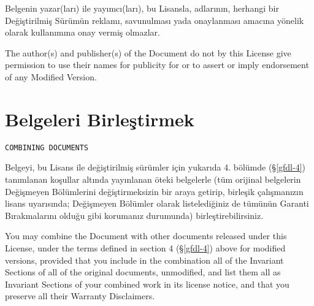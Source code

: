 \begin{multicols}{2}
Belgenin yazar(ları) ile yayımcı(ları), bu Lisansla, adlarının, herhangi bir Değiştirilmiş Sürümün reklamı, savunulması yada onaylanması amacına yönelik olarak kullanımına onay vermiş olmazlar.
\begin{ingliz}The author(s) and publisher(s) of the Document do not by
this License give permission to use their names for publicity
for or to assert or imply endorsement of any Modified Version.\end{ingliz}

\section{Belgeleri Birleştirmek}\hfill\begin{verbatim}COMBINING DOCUMENTS\end{verbatim}\label{gfdl-5}
Belgeyi, bu Lisans ile değiştirilmiş sürümler için yukarıda 4. bölümde (\S\thinspace\ref{gfdl-4}) tanımlanan koşullar altında yayınlanan öteki belgelerle (tüm orijinal belgelerin Değişmeyen Bölümlerini değiştirmeksizin bir araya getirip, birleşik çalışmanızın lisans uyarısında; Değişmeyen Bölümler olarak listelediğiniz de tümünün Garanti Bırakmalarını olduğu gibi korumanız durumunda) birleştirebilirsiniz.
\begin{ingliz}You may combine the Document with other documents released
under this License, under the terms defined in section 4 (\S\thinspace\ref{gfdl-4}) above for modified
versions, provided that you include in the combination all of
the Invariant Sections of all of the original documents,
unmodified, and list them all as Invariant Sections of your
combined work in its license notice, and that you preserve all
their Warranty Disclaimers.
\end{ingliz}


\end{multicols}
